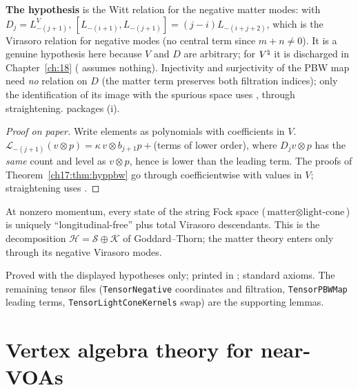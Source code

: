 \begin{dictionary}
\textbf{The hypothesis } is the Witt relation for the negative matter modes: with
$D_j=L^V_{-(j+1)}$, $[L_{-(i+1)},L_{-(j+1)}]=(j-i)L_{-(i+j+2)}$, which is the Virasoro relation for negative modes (no central
term since $m+n\ne0$).  It is a genuine hypothesis here because $V$ and $D$ are arbitrary; for ${V^{\natural}}$ it is discharged in
Chapter~\ref{ch:18} ( assumes nothing).  Injectivity and surjectivity of the PBW map need
\emph{no} relation on $D$ (the matter term preserves both filtration indices); only the identification of its image
with the spurious space uses , through straightening.   packages (i).
\end{dictionary}

\begin{proof}[Proof on paper]
Write elements as polynomials with coefficients in $V$.  $\mathcal L_{-(j+1)}(v\otimes p)=\kappa\,v\otimes b_{j+1}p+$(terms of lower
order), where $D_jv\otimes p$ has the \emph{same} count and level as $v\otimes p$, hence is lower than the leading term.  The
proofs of Theorem~\ref{ch17:thm:hyppbw} go through coefficientwise with values in $V$; straightening uses .
\end{proof}

\begin{physics}
At nonzero momentum, every state of the string Fock space ($\text{matter}\otimes\text{light-cone}$) is uniquely
``longitudinal-free'' plus total Virasoro descendants.  This is the decomposition $\mathcal H=\mathcal S\oplus\mathcal K$ of
Goddard--Thorn; the matter theory enters only through its negative Virasoro modes.
\end{physics}

\begin{status}
Proved with the displayed hypotheses only; printed in ; standard axioms.
The remaining tensor files (\texttt{TensorNegative} coordinates and filtration, \texttt{TensorPBWMap} leading terms,
\texttt{TensorLightConeKernels} swap) are the supporting lemmas.
\end{status}

\section{Vertex algebra theory for near-VOAs}\label{ch17:sec:near}

